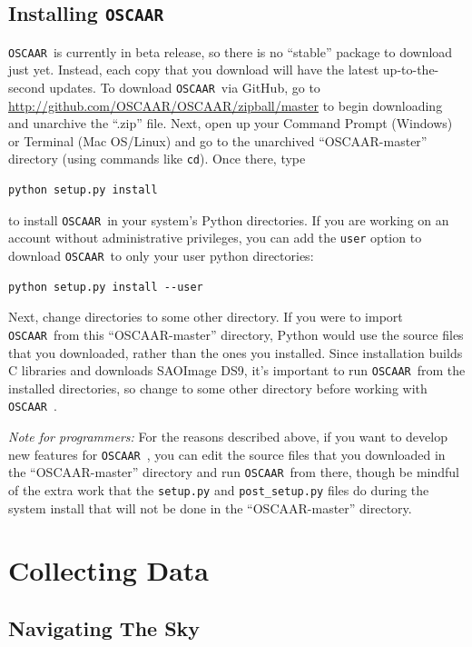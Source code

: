 \documentclass[a4paper]{article}
\newcommand{\code}[1]{\texttt{#1}}
\newcommand{\oscaar}{\code{OSCAAR}~}
\begin{document}
\subsection{Installing \oscaar}
\oscaar is currently in beta release, so there is no ``stable'' package to download just yet. Instead, each copy that you download will have the latest up-to-the-second updates. To download \oscaar via GitHub, go to \href{https://github.com/OSCAAR/OSCAAR/zipball/master}{http://github.com/OSCAAR/OSCAAR/zipball/master} to begin downloading and unarchive the ``.zip'' file. Next, open up your Command Prompt (Windows) or Terminal (Mac OS/Linux) and go to the unarchived ``OSCAAR-master'' directory (using commands like \code{cd}). Once there, type 
\begin{verbatim}
python setup.py install
\end{verbatim}
\noindent to install \oscaar in your system's Python directories. If you are working on an account without administrative privileges, you can add the \code{user} option to download \oscaar to only your user python directories:
\begin{verbatim}
python setup.py install --user
\end{verbatim}
Next, change directories to some other directory. If you were to import \oscaar from this ``OSCAAR-master'' directory, Python would use the source files that you downloaded, rather than the ones you installed. Since installation builds C libraries and downloads SAOImage DS9, it's important to run \oscaar from the installed directories, so change to some other directory before working with \oscaar.

\textit{Note for programmers:} For the reasons described above, if you want to develop new features for \oscaar, you can edit the source files that you downloaded in the  ``OSCAAR-master'' directory and run \oscaar from there, though be mindful of the extra work that the \code{setup.py} and \code{post\_setup.py} files do during the system install that will not be done in the  ``OSCAAR-master'' directory.

\section{Collecting Data} \label{sec:collectingData}

\subsection{Navigating The Sky} \label{sec:nav}
\end{document}
